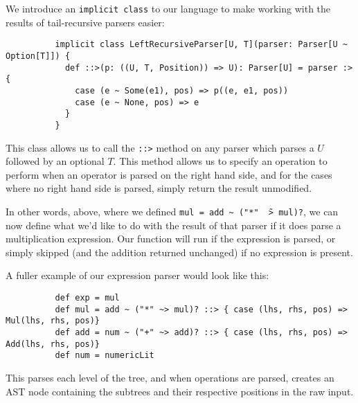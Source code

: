 \documentclass[british, twoside]{bhamthesis}
\theoremstyle{definition}
\begin{document}
        We introduce an \texttt{implicit class} to our language to make working with the results of tail-recursive parsers easier:
        \begin{lstlisting}
          implicit class LeftRecursiveParser[U, T](parser: Parser[U ~ Option[T]]) {
            def ::>(p: ((U, T, Position)) => U): Parser[U] = parser :> {
              case (e ~ Some(e1), pos) => p((e, e1, pos))
              case (e ~ None, pos) => e
            }
          }
        \end{lstlisting}

        This class allows us to call the \texttt{::>} method on any parser which parses a $U$ followed by an optional $T$. This method allows us to specify an operation to perform when an operator is parsed on the right hand side, and for the cases where no right hand side is parsed, simply return the result unmodified.

        In other words, above, where we defined \texttt{mul = add \~~("*" \~\ > mul)?}, we can now define what we'd like to do with the result of that parser if it does parse a multiplication expression. Our function will run if the expression is parsed, or simply skipped (and the addition returned unchanged) if no expression is present.

        A fuller example of our expression parser would look like this:
        \begin{lstlisting}
          def exp = mul
          def mul = add ~ ("*" ~> mul)? ::> { case (lhs, rhs, pos) => Mul(lhs, rhs, pos)}
          def add = num ~ ("+" ~> add)? ::> { case (lhs, rhs, pos) => Add(lhs, rhs, pos)}
          def num = numericLit
        \end{lstlisting}
        This parses each level of the tree, and when operations are parsed, creates an AST node containing the subtrees and their respective positions in the raw input.
\end{document}
